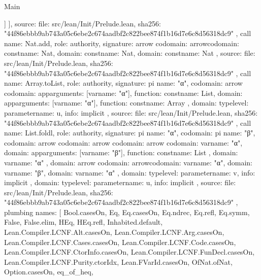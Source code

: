 \begin{lexlean}{Main}
\begin{toolingmodule}
{{{          ]
        }
      ],
      source: {
        file: src/lean/Init/Prelude.lean,
        sha256: "44f86ebbb9ab743a05c6ebe2c674aadbf2c822bee874f1b16d7e6c8d56318dc9"
      }
    },
    call{
      name: Nat.add,
      role: authority,
      signature: arrow{
        codomain: arrow{codomain: const{name: Nat}, domain: const{name: Nat}},
        domain: const{name: Nat}
      },
      source: {
        file: src/lean/Init/Prelude.lean,
        sha256: "44f86ebbb9ab743a05c6ebe2c674aadbf2c822bee874f1b16d7e6c8d56318dc9"
      }
    },
    call{
      name: Array.toList,
      role: authority,
      signature: pi{
        name: "α",
        codomain: arrow{
          codomain: app{arguments: [var{name: "α"}], function: const{name: List}},
          domain: app{arguments: [var{name: "α"}], function: const{name: Array}}
        },
        domain: type{level: parameter{name: u}},
        info: implicit
      },
      source: {
        file: src/lean/Init/Prelude.lean,
        sha256: "44f86ebbb9ab743a05c6ebe2c674aadbf2c822bee874f1b16d7e6c8d56318dc9"
      }
    },
    call{
      name: List.foldl,
      role: authority,
      signature: pi{
        name: "α",
        codomain: pi{
          name: "β",
          codomain: arrow{
            codomain: arrow{
              codomain: arrow{
                codomain: var{name: "α"},
                domain: app{arguments: [var{name: "β"}], function: const{name: List}}
              },
              domain: var{name: "α"}
            },
            domain: arrow{
              codomain: arrow{codomain: var{name: "α"}, domain: var{name: "β"}},
              domain: var{name: "α"}
            }
          },
          domain: type{level: parameter{name: v}},
          info: implicit
        },
        domain: type{level: parameter{name: u}},
        info: implicit
      },
      source: {
        file: src/lean/Init/Prelude.lean,
        sha256: "44f86ebbb9ab743a05c6ebe2c674aadbf2c822bee874f1b16d7e6c8d56318dc9"
      }
    },
    plumbing{
      names: [
        Bool.casesOn,
        Eq,
        Eq.casesOn,
        Eq.ndrec,
        Eq.refl,
        Eq.symm,
        False,
        False.elim,
        HEq,
        HEq.refl,
        Inhabited.default,
        Lean.Compiler.LCNF.Alt.casesOn,
        Lean.Compiler.LCNF.Arg.casesOn,
        Lean.Compiler.LCNF.Cases.casesOn,
        Lean.Compiler.LCNF.Code.casesOn,
        Lean.Compiler.LCNF.CtorInfo.casesOn,
        Lean.Compiler.LCNF.FunDecl.casesOn,
        Lean.Compiler.LCNF.Purity.ctorIdx,
        Lean.FVarId.casesOn,
        OfNat.ofNat,
        Option.casesOn,
        eq_of_heq,
}}
\end{toolingmodule}
\end{lexlean}

